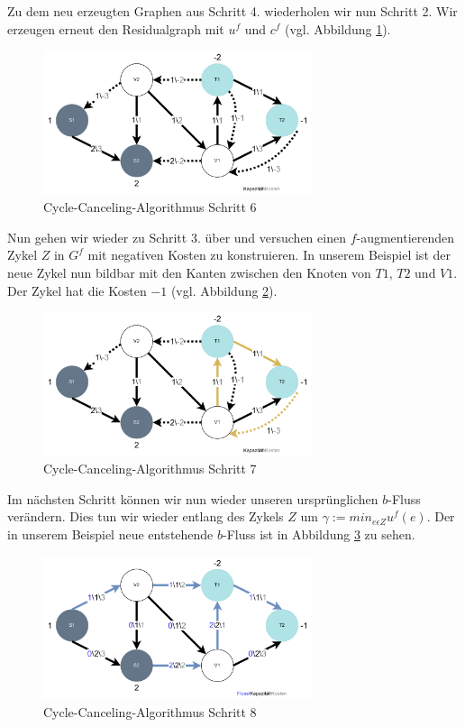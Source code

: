 Zu dem neu erzeugten Graphen aus Schritt 4. wiederholen wir nun Schritt 2. Wir erzeugen erneut den Residualgraph mit $u^f$ und $c^f$ (vgl. Abbildung \ref{fig:cc_step6}).
\begin{figure}[htb]
\centering
\includegraphics[width=0.7\textwidth]{img/leo/graph1-Page-6.drawio.pdf}
\caption{Cycle-Canceling-Algorithmus Schritt 6}
\label{fig:cc_step6}
\end{figure}

Nun gehen wir wieder zu Schritt 3. über und versuchen einen $f$-augmentierenden Zykel $Z$ in $G^f$ mit negativen Kosten zu konstruieren. In unserem Beispiel ist der neue Zykel nun bildbar mit den Kanten zwischen den Knoten von $T1$, $T2$ und $V1$. Der Zykel hat die Kosten $-1$ (vgl. Abbildung \ref{fig:cc_step7}).
\begin{figure}[htb]
\centering
\includegraphics[width=0.7\textwidth]{img/leo/graph1-Page-7.drawio.pdf}
\caption{Cycle-Canceling-Algorithmus Schritt 7}
\label{fig:cc_step7}
\end{figure}

Im nächsten Schritt können wir nun wieder unseren ursprünglichen $b$-Fluss verändern. Dies tun wir wieder entlang des Zykels $Z$ um $\gamma := min_{e \epsilon Z} u^f (e)$. Der in unserem Beispiel neue entstehende $b$-Fluss ist in Abbildung \ref{fig:cc_step8} zu sehen.
\begin{figure}[htb]
\centering
\includegraphics[width=0.7\textwidth]{img/leo/graph1-Page-8.drawio.pdf}
\caption{Cycle-Canceling-Algorithmus Schritt 8}
\label{fig:cc_step8}
\end{figure}

